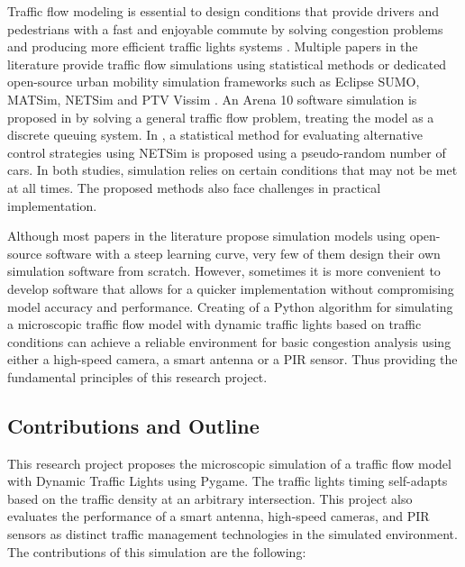 \documentclass[12pt, a4paper,titlepage]{article}
\begin{document}
Traffic flow modeling is essential to design conditions that provide drivers and pedestrians with a fast and enjoyable commute by solving congestion problems and producing more efficient traffic lights systems \cite{Wee13}. Multiple papers in the literature provide traffic flow simulations using statistical methods or dedicated open-source urban mobility simulation frameworks such as Eclipse SUMO, MATSim, NETSim and PTV Vissim \cite{Gartner92, Salimifard13}. An Arena 10 software simulation is proposed in \cite{Salimifard13} by solving a general traffic flow problem, treating the model as a discrete queuing system. In \cite{Gartner92}, a statistical method for evaluating alternative control strategies using NETSim is proposed using a pseudo-random number of cars. In both studies, simulation relies on certain conditions that may not be met at all times. The proposed methods also face challenges in practical implementation.

Although most papers in the literature propose simulation models using open-source software with a steep learning curve, very few of them design their own simulation software from scratch. However, sometimes it is more convenient to develop software that allows for a quicker implementation without compromising model accuracy and performance. Creating of a Python algorithm for simulating a microscopic traffic flow model with dynamic traffic lights based on traffic conditions can achieve a reliable environment for basic congestion analysis using either a high-speed camera, a smart antenna or a PIR sensor. Thus providing the fundamental principles of this research project. 

\newpage
\subsection{Contributions and Outline}

This research project proposes the microscopic simulation of a traffic flow model with Dynamic Traffic Lights using Pygame. The traffic lights timing self-adapts based on the traffic density at an arbitrary intersection. This project also evaluates the performance of a smart antenna, high-speed cameras, and PIR sensors as distinct traffic management technologies in the simulated environment. \\

The contributions of this simulation are the following:
\end{document}
